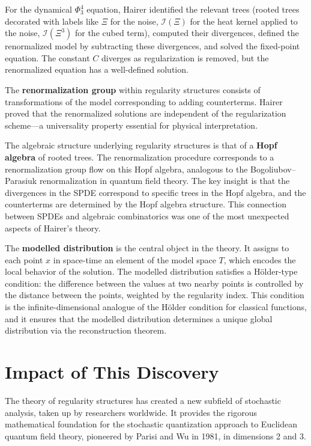 For the dynamical $\Phi^4_3$ equation, Hairer identified the relevant trees (rooted trees decorated with labels like $\Xi$ for the noise, $\mathcal{I}(\Xi)$ for the heat kernel applied to the noise, $\mathcal{I}(\Xi^3)$ for the cubed term), computed their divergences, defined the renormalized model by subtracting these divergences, and solved the fixed-point equation. The constant $C$ diverges as regularization is removed, but the renormalized equation has a well-defined solution.

The \textbf{renormalization group} within regularity structures consists of transformations of the model corresponding to adding counterterms. Hairer proved that the renormalized solutions are independent of the regularization scheme---a universality property essential for physical interpretation.

The algebraic structure underlying regularity structures is that of a \textbf{Hopf algebra} of rooted trees. The renormalization procedure corresponds to a renormalization group flow on this Hopf algebra, analogous to the Bogoliubov--Parasiuk renormalization in quantum field theory. The key insight is that the divergences in the SPDE correspond to specific trees in the Hopf algebra, and the counterterms are determined by the Hopf algebra structure. This connection between SPDEs and algebraic combinatorics was one of the most unexpected aspects of Hairer's theory.

The \textbf{modelled distribution} is the central object in the theory. It assigns to each point $x$ in space-time an element of the model space $T$, which encodes the local behavior of the solution. The modelled distribution satisfies a H\"{o}lder-type condition: the difference between the values at two nearby points is controlled by the distance between the points, weighted by the regularity index. This condition is the infinite-dimensional analogue of the H\"{o}lder condition for classical functions, and it ensures that the modelled distribution determines a unique global distribution via the reconstruction theorem.

\section{Impact of This Discovery}

The theory of regularity structures has created a new subfield of stochastic analysis, taken up by researchers worldwide. It provides the rigorous mathematical foundation for the stochastic quantization approach to Euclidean quantum field theory, pioneered by Parisi and Wu in 1981, in dimensions 2 and 3.

